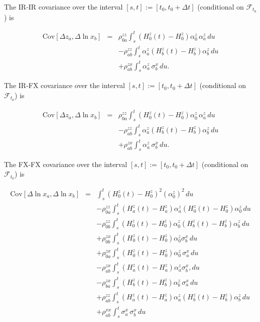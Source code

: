 \documentclass[12pt, a4paper]{article}
\begin{document}
{{\begin{appendix}
The IR-IR covariance over the interval $[s,t] := [t_0, t_0+\Delta t]$ (conditional on $\mathcal{F}_{t_0}$) is

\begin{eqnarray*}
      \mathrm{Cov} [\Delta z_a, \Delta \ln x_b] &=& \rho^{zz}_{0a}\int_s^t \left(H^z_0(t)-H^z_0\right)
  \alpha^z_0\,\alpha^z_a\,du \nonumber\\
      &&- \rho^{zz}_{ab}\int_s^t \alpha^z_a \left(H^z_b(t)-H^z_b\right) \alpha^z_b \,du \nonumber\\
      &&+\rho^{zx}_{ab}\int_s^t \alpha^z_a \, \sigma^x_b \,du.
\end{eqnarray*}

The IR-FX covariance over the interval $[s,t] := [t_0, t_0+\Delta t]$ (conditional on $\mathcal{F}_{t_0}$) is

\begin{eqnarray*}
      \mathrm{Cov} [\Delta z_a, \Delta \ln x_b] &=& \rho^{zz}_{0a}\int_s^t \left(H^z_0(t)-H^z_0\right)
  \alpha^z_0\,\alpha^z_a\,du \nonumber\\
      &&- \rho^{zz}_{ab}\int_s^t \alpha^z_a \left(H^z_b(t)-H^z_b\right) \alpha^z_b \,du \nonumber\\
      &&+\rho^{zx}_{ab}\int_s^t \alpha^z_a \, \sigma^x_b \,du.
\end{eqnarray*}

The FX-FX covariance over the interval $[s,t] := [t_0, t_0+\Delta t]$ (conditional on $\mathcal{F}_{t_0}$) is

\begin{eqnarray*}
      \mathrm{Cov}[\Delta \ln x_a, \Delta \ln x_b] &=&
      \int_s^t \left(H^z_0(t)-H^z_0\right)^2 (\alpha_0^z)^2\,du \nonumber\\
      && -\rho^{zz}_{0a} \int_s^t \left(H^z_a(t)-H^z_a\right) \alpha_a^z\left(H^z_0(t)-H^z_0\right) \alpha_0^z\,du
  \nonumber\\
      &&- \rho^{zz}_{0b}\int_s^t \left(H^z_0(t)-H^z_0\right)\alpha_0^z \left(H^z_b(t)-H^z_b\right)\alpha_b^z\,du
  \nonumber\\
      &&+ \rho^{zx}_{0b}\int_s^t \left(H^z_0(t)-H^z_0\right)\alpha_0^z \sigma^x_b\,du \nonumber\\
      &&+ \rho^{zx}_{0a}\int_s^t \left(H^z_0(t)-H^z_0\right)\alpha_0^z\,\sigma^x_a\,du \nonumber\\
      &&- \rho^{zx}_{ab}\int_s^t \left(H^z_a(t)-H^z_a\right)\alpha_a^z \sigma^x_b,du\nonumber\\
      &&- \rho^{zx}_{ba}\int_s^t \left(H^z_b(t)-H^z_b\right)\alpha_b^z\,\sigma^x_a\, du \nonumber\\
      &&+ \rho^{zz}_{ab}\int_s^t \left(H^z_a(t)-H^z_a\right)\alpha_a^z \left(H^z_b(t)-H^z_b\right)\alpha_b^z\,du
  \nonumber\\
      &&+ \rho^{xx}_{ab}\int_s^t\sigma^x_a\,\sigma^x_b \,du
\end{eqnarray*}


\end{appendix}}}
\end{document}
